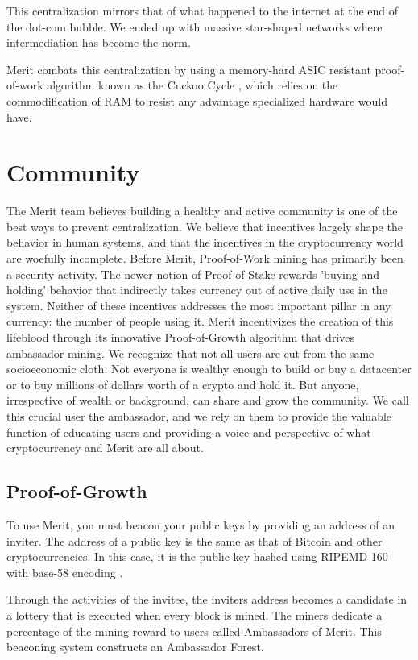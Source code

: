 \documentclass{article}
\begin{document}
This centralization mirrors that of what happened to the internet at the end of
the dot-com bubble.  We ended up with massive star-shaped networks where 
intermediation has become the norm.

Merit combats this centralization by using a memory-hard ASIC resistant
proof-of-work algorithm known as the Cuckoo Cycle \cite{cuckoo}, which relies
on the commodification of RAM to resist any advantage specialized hardware would
have.

\section{Community}

The Merit team believes building a healthy and active community is one of the best ways to
prevent centralization.  We believe that incentives largely shape the behavior in human systems, 
and that the incentives in the cryptocurrency world are woefully incomplete.  Before Merit, Proof-of-Work mining has primarily 
been a security activity.  The newer notion of Proof-of-Stake rewards 'buying and holding' behavior that indirectly takes 
currency out of active daily use in the system.  Neither of these incentives addresses the most important pillar in 
any currency: the number of people using it.  Merit incentivizes the creation of this lifeblood through its innovative Proof-of-Growth algorithm 
that drives ambassador mining.  We recognize that not all users are cut from the same socioeconomic cloth.  
Not everyone is wealthy enough to build or buy a datacenter or to buy millions of dollars worth of a crypto and hold it.  
But anyone, irrespective of wealth or background, can share and grow the community.  We call this crucial user the ambassador, and we rely on them 
to provide the valuable function
of educating users and providing a voice and perspective of what cryptocurrency and Merit are all about. 

\subsection{Proof-of-Growth}

To use Merit, you must \gls{beacon} your \glspl{public key} by providing an address of an inviter.
The address of a public key is the same as that of Bitcoin and other cryptocurrencies.
In this case, it is the public key hashed using RIPEMD-160 with base-58 encoding
\cite{ripemd}.

Through the activities of the invitee, the inviters address becomes a candidate in a lottery
that is executed when every block is mined.  The miners dedicate a percentage of the mining
reward to users called Ambassadors of Merit.  This beaconing system constructs
an Ambassador Forest.
\end{document}
